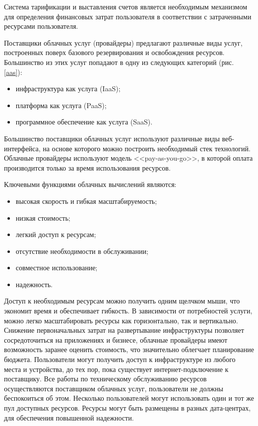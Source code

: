 Система тарификации и выставления счетов является необходимым механизмом для определения финансовых затрат пользователя в соответствии с затраченными ресурсами пользователя.

Поставщики облачных услуг (провайдеры) предлагают различные виды услуг, построенных поверх базового резервирования и освобождения ресурсов.
Большинство из этих услуг попадают в одну из следующих категорий (рис. \ref{aas}):
\begin{itemize}
  \item инфраструктура как услуга (IaaS);
  \item платформа как услуга (PaaS);
  \item программное обеспечение как услуга (SaaS).
\end{itemize}


Большинство поставщики облачных услуг используют различные виды веб-интерфейса, на основе которого можно построить необходимый стек технологий.
Облачные провайдеры используют модель <<pay-as-you-go>>, в которой оплата производится только за время использования ресурсов.

Ключевыми функциями облачных вычислений являются:
\begin{itemize}
  \item высокая скорость и гибкая масштабируемость;
  \item низкая стоимость;
  \item легкий доступ к ресурсам;
  \item отсутствие необходимости в обслуживании;
  \item совместное использование;
  \item надежность.
\end{itemize}

Доступ к необходимым ресурсам можно получить одним щелчком мыши, что экономит время и обеспечивает гибкость.
В зависимости от потребностей услуги, можно легко масштабировать ресурсы как горизонтально, так и вертикально.
Снижение первоначальных затрат на развертывание инфраструктуры позволяет сосредоточиться на приложениях и бизнесе, облачные провайдеры имеют возможность заранее оценить стоимость, что значительно облегчает планирование бюджета.
Пользователи могут получить доступ к инфраструктуре из любого места и устройства, до тех пор, пока существует интернет-подключение к поставщику.
Все работы по техническому обслуживанию ресурсов осуществляются поставщиком облачных услуг, пользователи не должны беспокоиться об этом.
Несколько пользователей могут использовать один и тот же пул доступных ресурсов.
Ресурсы могут быть размещены в разных дата-центрах, для обеспечения повышенной надежности.

